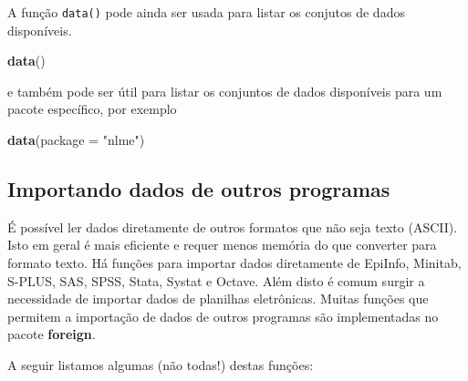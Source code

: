 \documentclass[10pt,a4paper]{book}
\newenvironment{Shaded}{\begin{snugshade}}{\end{snugshade}}
\newcommand{\KeywordTok}[1]{\textcolor[rgb]{0.13,0.29,0.53}{\textbf{#1}}}
\newcommand{\DataTypeTok}[1]{\textcolor[rgb]{0.13,0.29,0.53}{#1}}
\newcommand{\StringTok}[1]{\textcolor[rgb]{0.31,0.60,0.02}{#1}}
\newcommand{\NormalTok}[1]{#1}
\begin{document}
A função \texttt{data()} pode ainda ser usada para listar os conjutos de
dados disponíveis.

\begin{Shaded}
\begin{Highlighting}[]
\KeywordTok{data}\NormalTok{()}
\end{Highlighting}
\end{Shaded}

e também pode ser útil para listar os conjuntos de dados disponíveis
para um pacote específico, por exemplo

\begin{Shaded}
\begin{Highlighting}[]
\KeywordTok{data}\NormalTok{(}\DataTypeTok{package =} \StringTok{"nlme"}\NormalTok{)}
\end{Highlighting}
\end{Shaded}

\subsection{Importando dados de outros
programas}\label{importando-dados-de-outros-programas}

É possível ler dados diretamente de outros formatos que não seja texto
(ASCII). Isto em geral é mais eficiente e requer menos memória do que
converter para formato texto. Há funções para importar dados diretamente
de EpiInfo, Minitab, S-PLUS, SAS, SPSS, Stata, Systat e Octave. Além
disto é comum surgir a necessidade de importar dados de planilhas
eletrônicas. Muitas funções que permitem a importação de dados de outros
programas são implementadas no pacote \textbf{foreign}.

A seguir listamos algumas (não todas!) destas funções:
\end{document}
